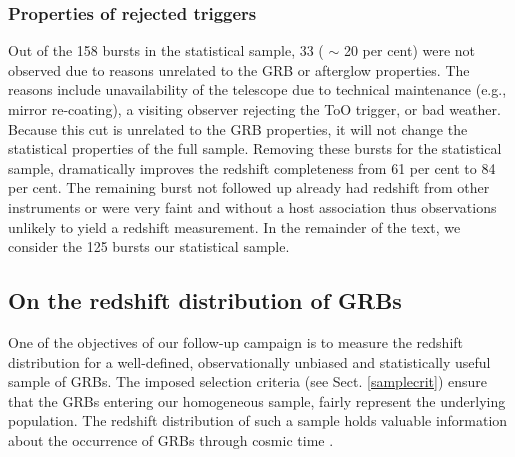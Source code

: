 \documentclass{aa}    %
\begin{document}
\subsubsection{Properties of rejected triggers} \label{badbursts}

Out of the 158 bursts in the statistical sample, 33 ( $\sim$ 20 per cent) were
not observed due to reasons unrelated to the GRB or afterglow properties. The
reasons include unavailability of the telescope due to technical maintenance
(e.g., mirror re-coating), a visiting observer rejecting the ToO trigger, or bad
weather. Because this cut is unrelated to the GRB properties, it will not change
the statistical properties of the full sample. Removing these bursts for the
statistical sample, dramatically improves the redshift completeness from 61 per cent to 84
per cent. The remaining burst not followed up already had redshift from other
instruments or were very faint and without a host association thus observations
unlikely to yield a redshift measurement. In the remainder of the text, we
consider the 125 bursts our statistical sample.

\subsection{On the redshift distribution of GRBs} \label{redshift}

One of the objectives of our follow-up campaign is to measure the redshift
distribution for a well-defined, observationally unbiased and statistically useful
sample of GRBs. The imposed selection criteria (see Sect. \ref{samplecrit})
ensure that the GRBs entering our homogeneous sample, fairly represent the
underlying population. The redshift distribution of such a sample holds valuable
information about the occurrence of GRBs through cosmic time
\citep{Jakobsson2012, Perley2016a}.


\end{document}
